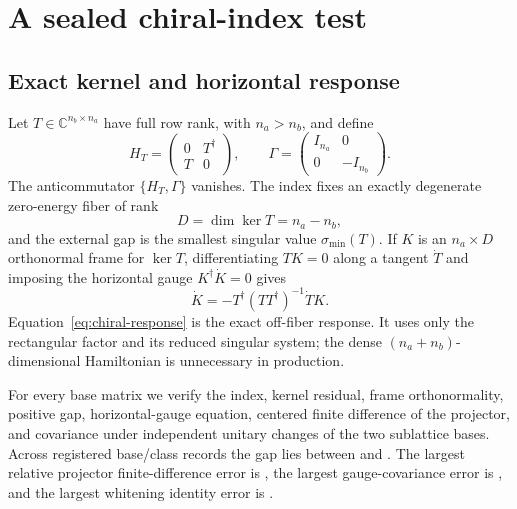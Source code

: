 \section{A sealed chiral-index test}
\label{sec:chiral-test}

\subsection{Exact kernel and horizontal response}

Let $T\in\mathbb C^{n_b\times n_a}$ have full row rank, with $n_a>n_b$, and define
\begin{equation}
 H_T=\begin{pmatrix}0&T^\dagger\\ T&0\end{pmatrix},\qquad
 \Gamma=\begin{pmatrix}I_{n_a}&0\\0&-I_{n_b}\end{pmatrix}.
 \label{eq:chiral-hamiltonian}
\end{equation}
The anticommutator $\{H_T,\Gamma\}$ vanishes.  The index fixes an exactly degenerate zero-energy fiber of rank
\begin{equation}
 D=\dim\ker T=n_a-n_b,
 \label{eq:chiral-index}
\end{equation}
and the external gap is the smallest singular value $\sigma_{\min}(T)$.  If $K$ is an $n_a\times D$ orthonormal frame for $\ker T$, differentiating $TK=0$ along a tangent $\dot T$ and imposing the horizontal gauge $K^\dagger\dot K=0$ gives
\begin{equation}
 \dot K=-T^\dagger(TT^\dagger)^{-1}\dot T K.
 \label{eq:chiral-response}
\end{equation}
Equation~\eqref{eq:chiral-response} is the exact off-fiber response.  It uses only the rectangular factor and its reduced singular system; the dense $(n_a+n_b)$-dimensional Hamiltonian is unnecessary in production.

For every base matrix we verify the index, kernel residual, frame orthonormality, positive gap, horizontal-gauge equation, centered finite difference of the projector, and covariance under independent unitary changes of the two sublattice bases.  Across \ChiralSafeBaseCount{} registered base/class records the gap lies between \ChiralGapMinimum{} and \ChiralGapMaximum{}.  The largest relative projector finite-difference error is \ChiralMaximumFiniteDifferenceError, the largest gauge-covariance error is \ChiralMaximumGaugeError, and the largest whitening identity error is \ChiralMaximumWhiteningError.

